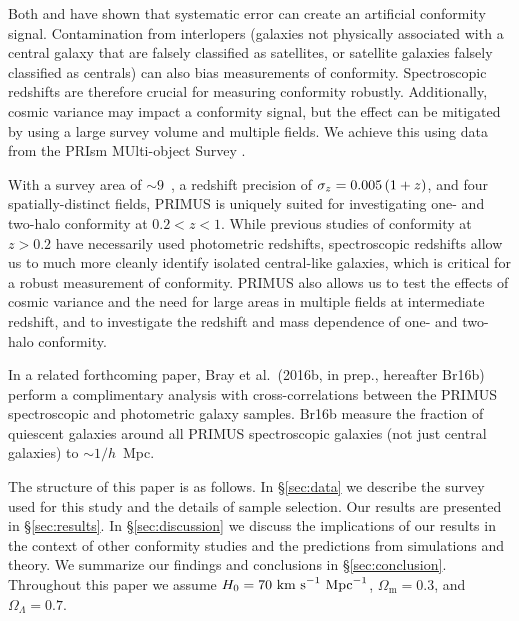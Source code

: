 Both \citet{Campbell15} and \citet{Paranjape15} have shown that systematic error can create an artificial conformity signal.
Contamination from interlopers (galaxies not physically associated with a central galaxy that are falsely classified as satellites, or satellite galaxies falsely classified as centrals) can also bias measurements of conformity.
Spectroscopic redshifts are therefore crucial for measuring conformity robustly.
Additionally, cosmic variance may impact a conformity signal, but the effect can be mitigated by using a large survey volume and multiple fields.
We achieve this using data from the PRIsm MUlti-object Survey \citep[PRIMUS;][]{Coil11, Cool13}.

With a survey area of $\sim9$~\degsq, a redshift precision of $\sigmaz=0.005\,(1+z)$, and four spatially-distinct fields, PRIMUS is uniquely suited for investigating one- and two-halo conformity at $0.2<z<1$.
While previous studies of conformity at $z>0.2$ have necessarily used photometric redshifts, spectroscopic redshifts allow us to much more cleanly identify isolated central-like galaxies, which is critical for a robust measurement of conformity.
PRIMUS also allows us to test the effects of cosmic variance and the need for large areas in multiple fields at intermediate redshift,
and to investigate the redshift and mass dependence of one- and two-halo conformity.

In a related forthcoming paper, Bray et al.~(2016b, in prep., hereafter Br16b) perform a complimentary analysis with cross-correlations between the PRIMUS spectroscopic and photometric galaxy samples.
Br16b measure the fraction of quiescent galaxies around all PRIMUS spectroscopic galaxies (not just central galaxies) to $\sim1/h$~Mpc.

The structure of this paper is as follows.
In \S\ref{sec:data} we describe the survey used for this study and the details of sample selection.
Our results are presented in \S\ref{sec:results}.
In \S\ref{sec:discussion} we discuss the implications of our results in the context of other conformity studies and the predictions from simulations and theory.
We summarize our findings and conclusions in \S\ref{sec:conclusion}.
Throughout this paper we assume $H_{0}=70~\textrm{km~s}^{-1}~\textrm{Mpc}^{-1}$, $\Omega_{\textrm{m}}=0.3$, and $\Omega_{\Lambda}=0.7$.